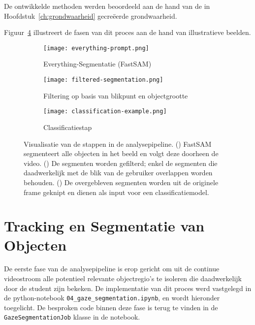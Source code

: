 De ontwikkelde methoden werden beoordeeld aan de hand van de in Hoofdstuk~\ref{ch:grondwaarheid} gecreëerde grondwaarheid.

Figuur~\ref{fig:analyse-pipeline-visualisatie} illustreert de fasen van dit proces aan de hand van illustratieve beelden.

\begin{figure}[H]
    \centering
        \begin{subfigure}[b]{0.75\textwidth}
        \centering
        \texttt{[image: everything-prompt.png]}
        \caption{Everything-Segmentatie (FastSAM)}
        \label{fig:pipeline_stap_a}
    \end{subfigure}

    \vspace{0.5cm}

    \begin{subfigure}[b]{0.75\textwidth}
    \centering
    \texttt{[image: filtered-segmentation.png]}
    \caption{Filtering op basis van blikpunt en objectgrootte}
    \label{fig:pipeline_stap_b}
    \end{subfigure}

    \vspace{0.5cm}

    \begin{subfigure}[b]{0.75\textwidth}
        \centering
        \texttt{[image: classification-example.png]}
        \caption{Classificatiestap}
        \label{fig:pipeline_stap_c}
    \end{subfigure}
    \caption[Visualisatie van de Analysepipeline]{
        \label{fig:analyse-pipeline-visualisatie}
        Visualisatie van de stappen in de analysepipeline.
        () FastSAM segmenteert alle objecten in het beeld en volgt deze doorheen de video.
        () De segmenten worden gefilterd; enkel de segmenten die daadwerkelijk met de blik van de gebruiker overlappen worden behouden.
        () De overgebleven segmenten worden uit de originele frame geknipt en dienen als input voor een classificatiemodel.
    }
\end{figure}

\section{Tracking en Segmentatie van Objecten}
\label{sec:tracking-segmentatie}

De eerste fase van de analysepipeline is erop gericht om uit de continue videostroom alle potentieel relevante objectregio's 
te isoleren die daadwerkelijk door de student zijn bekeken. 
De implementatie van dit proces werd vastgelegd in de python-notebook \texttt{04\_gaze\_segmentation.ipynb},
en wordt hieronder toegelicht.
De besproken code binnen deze fase is terug te vinden in de \texttt{GazeSegmentationJob} klasse in de notebook.

